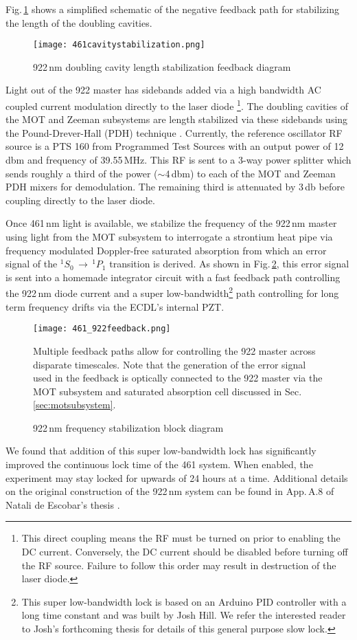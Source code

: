 Fig.\,\ref{fig:461cavityLock} shows a simplified schematic of the negative feedback path for stabilizing the length of the doubling cavities.
	\begin{figure}
		\centerline{
		\texttt{[image: 461cavitystabilization.png]}}
		\caption{922\,nm doubling cavity length stabilization feedback diagram}
		\label{fig:461cavityLock}
	\end{figure}
Light out of the 922 master has sidebands added via a high bandwidth AC coupled current modulation directly to the laser diode 
\footnote{This direct coupling means the RF must be turned on prior to enabling the DC current. 
Conversely, the DC current should be disabled before turning off the RF source. 
Failure to follow this order may result in destruction of the laser diode.}.
The doubling cavities of the MOT and Zeeman subsystems are length stabilized via these sidebands using the Pound-Drever-Hall (PDH) technique \cite{Drever1983}.
Currently, the reference oscillator RF source is a PTS 160 from Programmed Test Sources with an output power of 12\,dbm and frequency of 39.55\,MHz.
This RF is sent to a 3-way power splitter which sends roughly a third of the power ($\sim$4\,dbm) to each of the MOT and Zeeman PDH mixers for demodulation. 
The remaining third is attenuated by 3\,db before coupling directly to the laser diode.

Once 461\,nm light is available, we stabilize the frequency of the 922\,nm master using light from the MOT subsystem to interrogate a strontium heat pipe via frequency modulated Doppler-free saturated absorption from which an error signal of the $^1S_0\,\rightarrow\,^1P_1$ transition is derived.
As shown in Fig.\,\ref{fig:922freqLock}, this error signal is sent into a homemade integrator circuit with a fast feedback path controlling the 922\,nm diode current and a super low-bandwidth\footnote{This super low-bandwidth lock is based on an Arduino PID controller with a long time constant and was built by Josh Hill.
We refer the interested reader to Josh's forthcoming thesis for details of this general purpose slow lock.} 
path controlling for long term frequency drifts via the ECDL's internal PZT.
	\begin{figure}
		\centerline{
		\texttt{[image: 461\_922feedback.png]}}
		\caption{922\,nm frequency stabilization block diagram}{Multiple feedback paths allow for controlling the 922 master across disparate timescales. Note that the generation of the error signal used in the feedback is optically connected to the 922 master via the MOT subsystem and saturated absorption cell discussed in Sec.\,\ref{sec:motsubsystem}.}
		\label{fig:922freqLock}
	\end{figure} 
We found that addition of this super low-bandwidth lock has significantly improved the continuous lock time of the 461 system. 
When enabled, the experiment may stay locked for upwards of 24 hours at a time. 
Additional details on the original construction of the 922\,nm system can be found in App.\,A.8 of Natali de Escobar's thesis \cite{MartinezdeEscolar2010}.

